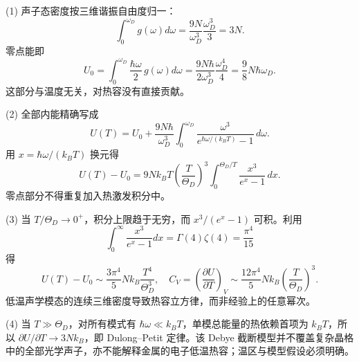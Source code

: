 (1) 声子态密度按三维谐振自由度归一：
\[
\int_0^{\omega_D}g(\omega)d\omega
=\frac{9N}{\omega_D^3}\frac{\omega_D^3}{3}=3N.
\]
零点能即
\[
U_0=\int_0^{\omega_D}\frac{\hbar\omega}{2}\,g(\omega)d\omega
=\frac{9N\hbar}{2\omega_D^3}\frac{\omega_D^4}{4}
=\frac98N\hbar\omega_D.
\]
这部分与温度无关，对热容没有直接贡献。

(2) 全部内能精确写成
\[
U(T)=U_0+\frac{9N\hbar}{\omega_D^3}
\int_0^{\omega_D}\frac{\omega^3}{e^{\hbar\omega/(k_BT)}-1}\,d\omega.
\]
用 \(x=\hbar\omega/(k_BT)\) 换元得
\[
U(T)-U_0=9Nk_BT\left(\frac{T}{\Theta_D}\right)^3
\int_0^{\Theta_D/T}\frac{x^3}{e^x-1}\,dx.
\]
零点部分不得重复加入热激发积分中。

(3) 当 \(T/\Theta_D\to0^+\)，积分上限趋于无穷，而 \(x^3/(e^x-1)\) 可积。利用
\[
\int_0^\infty\frac{x^3}{e^x-1}dx=\Gamma(4)\zeta(4)=\frac{\pi^4}{15}
\]
得
\[
U(T)-U_0\sim\frac{3\pi^4}{5}Nk_B\frac{T^4}{\Theta_D^3},
\quad
C_V=\left(\frac{\partial U}{\partial T}\right)_V
\sim\frac{12\pi^4}{5}Nk_B\left(\frac{T}{\Theta_D}\right)^3.
\]
低温声学模态的连续三维密度导致热容立方律，而非经验上的任意幂次。

(4) 当 \(T\gg\Theta_D\)，对所有模式有 \(\hbar\omega\ll k_BT\)，单模总能量的热依赖首项为 \(k_BT\)，所以 \(\partial U/\partial T\to3Nk_B\)，即 Dulong–Petit 定律。该 Debye 截断模型并不覆盖复杂晶格中的全部光学声子，亦不能解释金属的电子低温热容；温区与模型假设必须明确。
